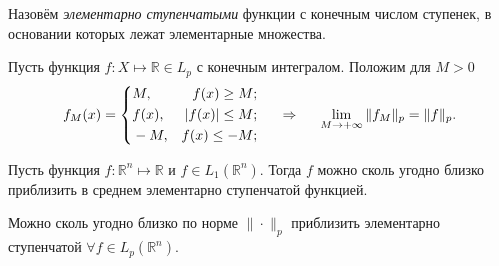 
\begin{to_def}
    Назовём \textit{элементарно ступенчатыми} функции с конечным числом ступенек, в основании которых лежат элементарные множества.
\end{to_def}

\textcolor{ugray}{
\begin{to_thr}[]
    Пусть функция $f \colon  X \mapsto \mathbb{R} \in L_p$ с конечным интегралом. Положим для $M > 0$
    \begin{equation*}
        f_M (x) = \left\{\begin{aligned}
            &M, &f(x) \geq M; \\
            &f(x), &|f(x)| \leq M; \\
            &-M, &f(x) \leq - M;            
        \end{aligned}\right.
        \hspace{0.5cm} \Rightarrow \hspace{0.5cm}
        \lim_{M \to + \infty} \|f_M\|_p = \|f\|_p.
    \end{equation*}
\end{to_thr}
}

\textcolor{ugray}{
\begin{to_thr}[]
    Пусть функция $f \colon \mathbb{R}^n \mapsto \mathbb{R}$ и $f \in L_1 \left(\mathbb{R}^n\right)$. Тогда $f$ можно сколь угодно близко приблизить в среднем элементарно ступенчатой функцией. 
\end{to_thr}
}

\begin{to_thr}[]
     Можно сколь угодно близко по норме $\| \cdot \|_p$ приблизить элементарно ступенчатой $\forall f \in L_p(\mathbb{R}^n)$.
\end{to_thr}


